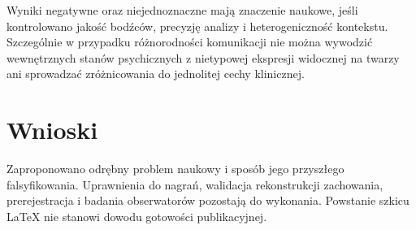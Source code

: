 \documentclass[11pt,a4paper]{article}
\begin{document}
Wyniki negatywne oraz niejednoznaczne mają znaczenie naukowe, jeśli kontrolowano jakość bodźców, precyzję analizy i heterogeniczność kontekstu. Szczególnie w przypadku różnorodności komunikacji nie można wywodzić wewnętrznych stanów psychicznych z nietypowej ekspresji widocznej na twarzy ani sprowadzać zróżnicowania do jednolitej cechy klinicznej.
\section{Wnioski}
Zaproponowano odrębny problem naukowy i sposób jego przyszłego falsyfikowania. Uprawnienia do nagrań, walidacja rekonstrukcji zachowania, prerejestracja i badania obserwatorów pozostają do wykonania. Powstanie szkicu LaTeX nie stanowi dowodu gotowości publikacyjnej.
\end{document}
